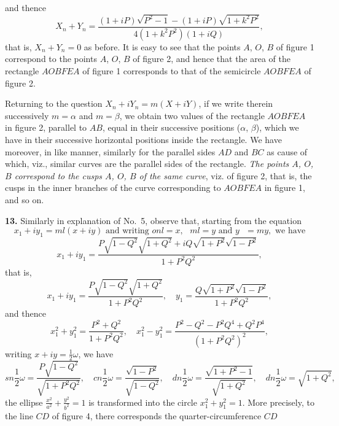 \documentclass[11pt,a4paper]{article}
\begin{document}
and thence
\[
X_n + Y_n = \frac{(1 + i P)\sqrt{P^2 - 1} - (1 + i P)\sqrt{1 + k^2 P^2}}{4(1 + k^2 P^2)(1 + i Q)},
\]
that is, $X_n + Y_n = 0$ as before. It is easy to see that the points $A$, $O$, $B$ of figure 1 correspond to the points $A$, $O$, $B$ of figure 2, and hence that the area of the rectangle $AOBFEA$ of figure 1 corresponds to that of the semicircle $AOBFEA$ of figure 2.

Returning to the question $X_n + iY_n = m (X + iY)$, if we write therein successively $m = \alpha$ and $m = \beta$, we obtain two values of the rectangle $AOBFEA$ in figure 2, parallel to $AB$, equal in their successive positions ($\alpha$, $\beta$), which we have in their successive horizontal positions inside the rectangle. We have moreover, in like manner, similarly for the parallel sides $AD$ and $BC$ as cause of which, viz., similar curves are the parallel sides of the rectangle. \textit{The points $A$, $O$, $B$ correspond to the cusps $A$, $O$, $B$ of the same curve}, viz. of figure 2, that is, the cusps in the inner branches of the curve corresponding to $AOBFEA$ in figure 1, and so on.

\textbf{13.} Similarly in explanation of No.\ 5, observe that, starting from the equation
\[
x_1 + i y_1 = ml (x + iy) \text{ and writing } onl = x, \text{ } ml = y \text{ and } y \text{ } = m y, \text{ we have}
\]
\[
x_1 + iy_1 = \frac{P\sqrt{1 - Q^2}\sqrt{1 + Q^2} + iQ\sqrt{1 + P^2}\sqrt{1 - P^2}}{1 + P^2 Q^2},
\]
that is,
\[
x_1 + iy_1 = \frac{P\sqrt{1 - Q^2}\sqrt{1 + Q^2}}{1 + P^2 Q^2}, \quad y_1 = \frac{Q\sqrt{1 + P^2}\sqrt{1 - P^2}}{1 + P^2 Q^2},
\]
and thence
\[
x_1^2 + y_1^2 = \frac{P^2 + Q^2}{1 + P^2 Q^2}, \quad x_1^2 - y_1^2 = \frac{P^2 - Q^2 - P^2 Q^4 + Q^2 P^4}{(1 + P^2 Q^2)^2},
\]
writing $x + iy = \frac{1}{2}\omega$, we have
\[
sn \frac{1}{2}\omega = \frac{P\sqrt{1 - Q^2}}{\sqrt{1 + P^2 Q^2}}, \quad cn \frac{1}{2}\omega = \frac{\sqrt{1 - P^2}}{\sqrt{1 - Q^2}}, \quad dn \frac{1}{2}\omega = \frac{\sqrt{1 + P^2 - 1}}{\sqrt{1 + Q^2}}, \quad dn \frac{1}{2}\omega = \sqrt{1 + Q^2},
\]
the ellipse $\frac{x^2}{a^2} + \frac{y^2}{b^2} = 1$ is transformed into the circle $x_1^2 + y_1^2 = 1$. More precisely, to the line $CD$ of figure 4, there corresponds the quarter-circumference $CD$
\end{document}
